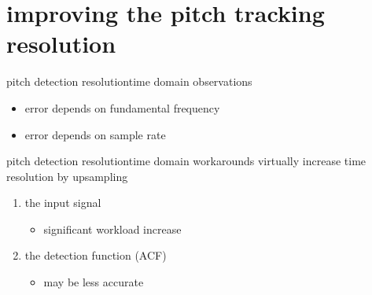     \section[time domain]{improving the pitch tracking resolution}
        \begin{frame}{pitch detection resolution}{time domain observations}
            
            \begin{itemize}
                \item   error depends on fundamental frequency
                \item   error depends on sample rate
            \end{itemize}
        \end{frame}
        \begin{frame}{pitch detection resolution}{time domain workarounds}
            \vspace{-2mm}
            virtually increase time resolution by upsampling
            
            \begin{enumerate}
                \item   the input signal
                    \begin{itemize}
                        \item   significant workload increase
                    \end{itemize}
                \item<2->   the detection function (ACF)
                    \begin{itemize}
                        \item   may be less accurate
                    \end{itemize}
            \end{enumerate}
        \end{frame}
	
